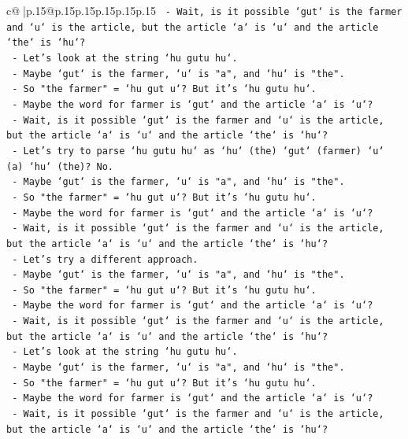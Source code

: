 \documentclass{article}
\begin{document}
{\begin{supertabular}{c@{$\;$}|p{.15\linewidth}@{}p{.15\linewidth}p{.15\linewidth}p{.15\linewidth}p{.15\linewidth}p{.15\linewidth}}
{{{\texttt{   {-} Wait, is it possible `gut` is the farmer and `u` is the article, but the article `a` is `u` and the article `the` is `hu`?} \\
\texttt{   {-} Let's look at the string `hu gutu hu`.} \\
\texttt{   {-} Maybe `gut` is the farmer, `u` is "a", and `hu` is "the".} \\
\texttt{   {-} So "the farmer" = `hu gut u`? But it's `hu gutu hu`.} \\
\texttt{   {-} Maybe the word for farmer is `gut` and the article `a` is `u`?} \\
\texttt{   {-} Wait, is it possible `gut` is the farmer and `u` is the article, but the article `a` is `u` and the article `the` is `hu`?} \\
\texttt{   {-} Let's try to parse `hu gutu hu` as `hu` (the) `gut` (farmer) `u` (a) `hu` (the)? No.} \\
\texttt{   {-} Maybe `gut` is the farmer, `u` is "a", and `hu` is "the".} \\
\texttt{   {-} So "the farmer" = `hu gut u`? But it's `hu gutu hu`.} \\
\texttt{   {-} Maybe the word for farmer is `gut` and the article `a` is `u`?} \\
\texttt{   {-} Wait, is it possible `gut` is the farmer and `u` is the article, but the article `a` is `u` and the article `the` is `hu`?} \\
\texttt{   {-} Let's try a different approach.} \\
\texttt{   {-} Maybe `gut` is the farmer, `u` is "a", and `hu` is "the".} \\
\texttt{   {-} So "the farmer" = `hu gut u`? But it's `hu gutu hu`.} \\
\texttt{   {-} Maybe the word for farmer is `gut` and the article `a` is `u`?} \\
\texttt{   {-} Wait, is it possible `gut` is the farmer and `u` is the article, but the article `a` is `u` and the article `the` is `hu`?} \\
\texttt{   {-} Let's look at the string `hu gutu hu`.} \\
\texttt{   {-} Maybe `gut` is the farmer, `u` is "a", and `hu` is "the".} \\
\texttt{   {-} So "the farmer" = `hu gut u`? But it's `hu gutu hu`.} \\
\texttt{   {-} Maybe the word for farmer is `gut` and the article `a` is `u`?} \\
\texttt{   {-} Wait, is it possible `gut` is the farmer and `u` is the article, but the article `a` is `u` and the article `the` is `hu`?} \\
}}}
\end{supertabular}}
\end{document}
